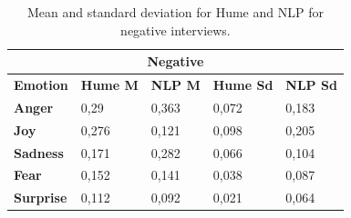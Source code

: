 \begin{table}[H]
    \begin{tabular}{lllll}
    \multicolumn{5}{c}{\cellcolor[HTML]{BFBFBF}Negative}                                                                                                                                                \\ \hline
    \multicolumn{1}{|l|}{\textbf{Emotion}}  & \multicolumn{1}{c|}{\textbf{Hume M}} & \multicolumn{1}{c|}{\textbf{NLP M}} & \multicolumn{1}{c|}{\textbf{Hume Sd}} & \multicolumn{1}{c|}{\textbf{NLP Sd}} \\ \hline
    \multicolumn{1}{|l|}{\textbf{Anger}}    & 0,29                                 & 0,363                               & 0,072                                 & 0,183                                \\ \cline{1-1}
    \multicolumn{1}{|l|}{\textbf{Joy}}      & 0,276                                & 0,121                               & 0,098                                 & 0,205                                \\ \cline{1-1}
    \multicolumn{1}{|l|}{\textbf{Sadness}}  & 0,171                                & 0,282                               & 0,066                                 & 0,104                                \\ \cline{1-1}
    \multicolumn{1}{|l|}{\textbf{Fear}}     & 0,152                                & 0,141                               & 0,038                                 & 0,087                                \\ \cline{1-1}
    \multicolumn{1}{|l|}{\textbf{Surprise}} & 0,112                                & 0,092                               & 0,021                                 & 0,064                                \\ \cline{1-1}
    \end{tabular}
    \caption{Mean and standard deviation for Hume and NLP for negative interviews.}
    \label{tab:summery_hume_nlp_neg}
\end{table}


